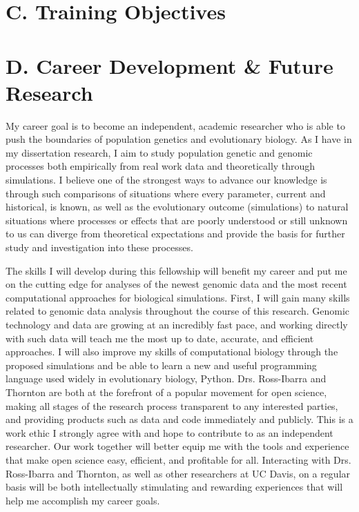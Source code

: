 \section*{C. Training Objectives}

\section*{D. Career Development \& Future Research}

My career goal is to become an independent, academic researcher who is able to push the boundaries of population genetics and evolutionary biology. As I have in my dissertation research, I aim to study population genetic and genomic processes both empirically from real work data and theoretically through simulations. I believe one of the strongest ways to advance our knowledge is through such comparisons of situations where every parameter, current and historical, is known, as well as the evolutionary outcome (simulations) to natural situations where processes or effects that are poorly understood or still unknown to us can diverge from theoretical expectations and provide the basis for further study and investigation into these processes.

The skills I will develop during this fellowship will benefit my career and put me on the cutting edge for analyses of the newest genomic data and the most recent computational approaches for biological simulations. First, I will gain many skills related to genomic data analysis throughout the course of this research. Genomic technology and data are growing at an incredibly fast pace, and working directly with such data will teach me the most up to date, accurate, and efficient approaches. I will also improve my skills of computational biology through the proposed simulations and be able to learn a new and useful programming language used widely in evolutionary biology, Python. Drs. Ross\--Ibarra and Thornton are both at the forefront of a popular  movement for open science, making all stages of the research process transparent to any interested parties, and providing products such as data and code immediately and publicly. This is a work ethic I strongly agree with and hope to contribute to as an independent researcher. Our work together will better equip me with the tools and experience that make open science easy, efficient, and profitable for all. Interacting with Drs. Ross\--Ibarra and Thornton, as well as other researchers at UC Davis, on a regular basis will be both intellectually stimulating and rewarding experiences that will help me accomplish my career goals.


